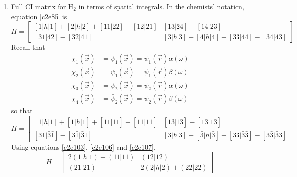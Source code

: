 \begin{enumerate}
\item\label{c2p17} Full CI matrix for H$_2$ in terms of spatial integrals.
In the chemists' notation, equation \eqref{c2e85} is
\[
H = \begin{bmatrix}
[1|h|1]+[2|h|2]+[11|22]-[12|21] & [13|24] - [14|23] \\
[31|42] - [32|41] & [3|h|3]+[4|h|4]+[33|44]-[34|43]
\end{bmatrix}
\]
Recall that
\[
\begin{aligned}
\chi_1(\vec{x}) &= \psi_1(\vec{x}) = \psi_1(\vec{r})\alpha(\omega) \\
\chi_2(\vec{x}) &= \bar{\psi}_1(\vec{x}) = \psi_1(\vec{r})\beta(\omega) \\
\chi_3(\vec{x}) &= \psi_2(\vec{x}) = \psi_2(\vec{r})\alpha(\omega) \\
\chi_4(\vec{x}) &= \bar{\psi}_2(\vec{x}) = \psi_2(\vec{r})\beta(\omega) 
\end{aligned}
\]
so that
\[
H = \begin{bmatrix}
[1|h|1]+[\bar{1}|h|\bar{1}]+[11|\bar{1}\bar{1}]-[1\bar{1}|\bar{1}1] & 
[13|\bar{1}\bar{3}] - [1\bar{3}|\bar{1}3] \\
[31|\bar{3}\bar{1}] - [3\bar{1}|\bar{3}1] & 
[3|h|3]+[\bar{3}|h|\bar{3}]+[33|\bar{3}\bar{3}]-[3\bar{3}|\bar{3}3]
\end{bmatrix}
\]
Using equations \eqref{c2e103}, \eqref{c2e106} and \eqref{c2e107},
\[
H = \begin{bmatrix}
2(1|h|1) + (11|11) & (12|12) \\
(21|21) & 2(2|h|2) + (22|22)
\end{bmatrix}
\]


\end{enumerate}
